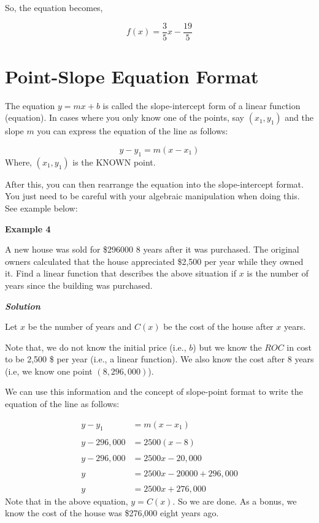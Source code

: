 \documentclass[
  letterpaper,
  DIV=11,
  numbers=noendperiod]{scrreprt}
\begin{document}
So, the equation becomes,

\[f(x)=\frac{3}{5}x-\frac{19}{5}\]

\hypertarget{point-slope-equation-format}{%
\section{Point-Slope Equation
Format}\label{point-slope-equation-format}}

The equation \(y=mx+b\) is called the slope-intercept form of a linear
function (equation). In cases where you only know one of the points, say
\((x_1,y_1)\) and the slope \(m\) you can express the equation of the
line as follows:

\[y-y_1=m(x-x_1)\] Where, \((x_1,y_1)\) is the KNOWN point.

After this, you can then rearrange the equation into the slope-intercept
format. You just need to be careful with your algebraic manipulation
when doing this. See example below:

\textbf{Example 4}

A new house was sold for \$296000 8 years after it was purchased. The
original owners calculated that the house appreciated \$2,500 per year
while they owned it. Find a linear function that describes the above
situation if \(x\) is the number of years since the building was
purchased.

\textbf{\emph{Solution}}

Let \(x\) be the number of years and \(C(x)\) be the cost of the house
after \(x\) years.

Note that, we do not know the initial price (i.e., \(b\)) but we know
the \(ROC\) in cost to be 2,500 \$ per year (i.e., a linear function).
We also know the cost after 8 years (i.e, we know one point
\((8, 296,000)\)).

We can use this information and the concept of slope-point format to
write the equation of the line as follows:

\[
\begin{aligned}
y-y_1&=m(x-x_1)\\ \\
y-296,000&=2500(x-8)\\ \\
y-296,000&=2500x-20,000\\ \\
y&=2500x-20000+296,000\\ \\
y&=2500x+276,000
\end{aligned}
\] Note that in the above equation, \(y=C(x)\). So we are done. As a
bonus, we know the cost of the house was \$276,000 eight years ago.
\end{document}
